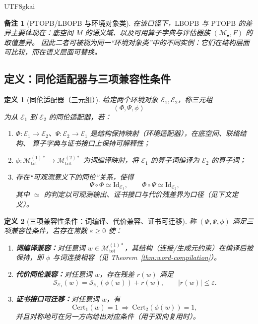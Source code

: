 \documentclass[12pt]{article}
\newtheorem{definition}{定义}[section]
\newtheorem{remark}{备注}[section]
\newcommand{\LBOPB}{\ensuremath{\mathrm{LBOPB}}}
\newcommand{\PTOPB}{\ensuremath{\mathrm{PTOPB}}}
\begin{document}
\begin{CJK*}{UTF8}{gkai}
\begin{remark}[PTOPB/LBOPB 与环境对象类]
在该口径下，\LBOPB{} 与 \PTOPB{} 的差异主要体现在：底空间 $M$ 的语义域、以及可用算子字典与评估器族 $(\mathcal{M}_{\bullet},F)$ 的取值差异。
因此二者可被视为同一“环境对象类”中的不同实例：它们在结构层面可比较，而在语义层面可替换。
\end{remark}

\subsection{定义：同伦适配器与三项兼容性条件}

\begin{definition}[同伦适配器（三元组）]
\label{def:homotopy-adapter}
给定两个环境对象 $\mathcal{E}_1,\mathcal{E}_2$，称三元组
\[
(\Phi,\Psi,\phi)
\]
为从 $\mathcal{E}_1$ 到 $\mathcal{E}_2$ 的同伦适配器，若：
\begin{enumerate}
  \item $\Phi:\mathcal{E}_1\to\mathcal{E}_2$、$\Psi:\mathcal{E}_2\to\mathcal{E}_1$ 是结构保持映射（环境适配器），在底空间、联络结构、
    算子字典与证书接口上保持可解释性；
  \item $\phi:\mathcal{M}_{\mathrm{tot}}^{(1)\ast}\to \mathcal{M}_{\mathrm{tot}}^{(2)\ast}$ 为词编译映射，将 $\mathcal{E}_1$
    的算子词编译为 $\mathcal{E}_2$ 的算子词；
  \item 存在“可观测意义下的同伦”关系，使得
  \[
  \Psi\circ\Phi \simeq \mathrm{Id}_{\mathcal{E}_1},
  \qquad
  \Phi\circ\Psi \simeq \mathrm{Id}_{\mathcal{E}_2},
  \]
  其中 $\simeq$ 的判定以可观测输出、证书接口与代价残差界为口径（见下文定义）。
\end{enumerate}
\end{definition}

\begin{definition}[三项兼容性条件：词编译、代价兼容、证书可迁移]
\label{def:compatibility-three}
称 $(\Phi,\Psi,\phi)$ 满足三项兼容性条件，若存在常数 $\varepsilon\ge 0$ 使：
\begin{enumerate}
  \item \textbf{词编译兼容：}对任意词 $w\in \mathcal{M}_{\mathrm{tot}}^{(1)\ast}$，其结构（连接/生成元约束）在编译后被保持，即 $\phi$ 与词连接相容（见
    Theorem~\ref{thm:word-compilation}）。
  \item \textbf{代价同伦兼容：}对任意词 $w$，存在残差 $r(w)$ 满足
  \[
  \mathcal{S}_{\mathcal{E}_1}(w)=\mathcal{S}_{\mathcal{E}_2}(\phi(w)) + r(w),
  \qquad |r(w)|\le \varepsilon.
  \]
  \item \textbf{证书接口可迁移：}对任意词 $w$，有
  \[
  \mathrm{Cert}_1(w)=1\ \Longrightarrow\ \mathrm{Cert}_2(\phi(w))=1,
  \]
  并且对称地可在另一方向给出对应条件（用于双向复用时）。
\end{enumerate}
\end{definition}


\end{CJK*}
\end{document}
